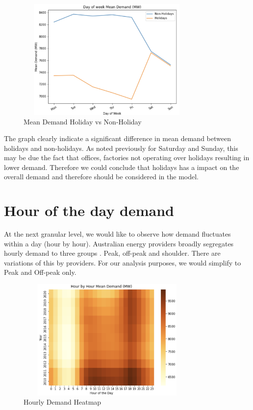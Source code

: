 \documentclass[mstat,12pt]{unswthesis}
\begin{document}
\begin{figure}[H]
\centering
\includegraphics[width=0.80\textwidth,height=6cm]{day_demand.png}
\caption{Mean Demand Holiday vs Non-Holiday}
\label{day_demand}
\end{figure}

The graph clearly indicate a significant difference in mean demand
between holidays and non-holidays. As noted previously for Saturday and
Sunday, this may be due the fact that offices, factories not operating
over holidays resulting in lower demand. Therefore we could conclude
that holidays has a impact on the overall demand and therefore should be
considered in the model.

\section{Hour of the day demand}\label{hour-of-the-day-demand}

At the next granular level, we would like to observe how demand
fluctuates within a day (hour by hour). Australian energy providers
broadly segregates hourly demand to three groups
\cite{wrigley_2019_peak}. Peak, off-peak and shoulder. There are
variations of this by providers. For our analysis purposes, we would
simplify to Peak and Off-peak only.

\begin{figure}[H]
\centering
\includegraphics[width=0.80\textwidth,height=6cm]{hour_heat.png}
\caption{Hourly Demand Heatmap}
\label{hour_heat}
\end{figure}
\end{document}
